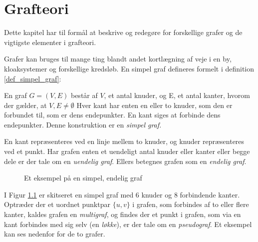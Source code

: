 \chapter{Grafteori}
\usetikzlibrary{arrows, automata}

Dette kapitel har til formål at beskrive og redegøre for forskellige grafer og de vigtigste elementer i grafteori. 

Grafer kan bruges til mange ting blandt andet kortlægning af veje i en by, kloaksystemer og forskellige kredsløb.
En simpel graf defineres formelt i definition \ref{def_simpel_graf}:


\begin{defn}
En graf $G = (V, E)$ består af $V$, et antal knuder, og E, et antal kanter, hvorom der gælder, at $V, E \neq \emptyset$
Hver kant har enten en eller to knuder, som den er forbundet til, som er dens endepunkter.
En kant siges at forbinde dens endepunkter. Denne konstruktion er en \it{simpel graf}.
\label{def_simpel_graf}
\end{defn}

\noindent En kant repræsenteres ved en linje mellem to knuder, og knuder repræsenteres ved et punkt. Har grafen enten et uendeligt antal knuder eller kanter eller begge dele er der tale om en \textit{uendelig graf}. Ellers betegnes grafen som en \textit{endelig graf}.

\begin{figure}[h]
\centering
{}
\caption{Et eksempel på en simpel, endelig graf} \label{simpel_graf}
\end{figure}


\noindent I Figur \ref{simpel_graf} er skitseret en simpel graf med $6$ knuder og $8$ forbindende kanter. \\ 

\noindent Optræder der et uordnet punktpar $\lbrace u,v \rbrace$ i grafen, som forbindes af to eller flere kanter, kaldes grafen en \textit{multigraf}, og findes der et punkt i grafen, som via en kant forbindes med sig selv (en \textit{løkke}), er der tale om en \textit{pseudograf}. Et eksempel kan ses nedenfor for de to grafer.

